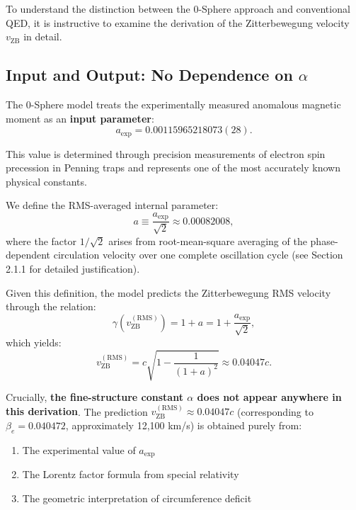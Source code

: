 \documentclass[12pt,letterpaper]{article}
\begin{document}
To understand the distinction between the 0-Sphere approach and conventional QED, it is instructive to examine the derivation of the Zitterbewegung velocity $v_{\mathrm{ZB}}$ in detail.

\subsection{Input and Output: No Dependence on $\alpha$}

The 0-Sphere model treats the experimentally measured anomalous magnetic moment as an \textbf{input parameter}:
\begin{equation}
a_{\mathrm{exp}} = 0.00115965218073(28).
\end{equation}

This value is determined through precision measurements of electron spin precession in Penning traps and represents one of the most accurately known physical constants.

We define the RMS-averaged internal parameter:
\begin{equation}
a \equiv \frac{a_{\mathrm{exp}}}{\sqrt{2}} \approx 0.00082008,
\end{equation}
where the factor $1/\sqrt{2}$ arises from root-mean-square averaging of the phase-dependent circulation velocity over one complete oscillation cycle (see Section 2.1.1 for detailed justification).

Given this definition, the model predicts the Zitterbewegung RMS velocity through the relation:
\begin{equation}
\gamma(v_{\mathrm{ZB}}^{(\mathrm{RMS})}) = 1 + a = 1 + \frac{a_{\mathrm{exp}}}{\sqrt{2}},
\end{equation}
which yields:
\begin{equation}
v_{\mathrm{ZB}}^{(\mathrm{RMS})} = c \sqrt{1 - \frac{1}{(1 + a)^2}} \approx 0.04047c.
\end{equation}

Crucially, \textbf{the fine-structure constant $\alpha$ does not appear anywhere in this derivation}. The prediction $v_{\mathrm{ZB}}^{(\mathrm{RMS})} \approx 0.04047c$ (corresponding to $\beta_e = 0.040472$, approximately 12,100 km/s) is obtained purely from:
\begin{enumerate}
\item The experimental value of $a_{\mathrm{exp}}$
\item The Lorentz factor formula from special relativity
\item The geometric interpretation of circumference deficit
\end{enumerate}
\end{document}
